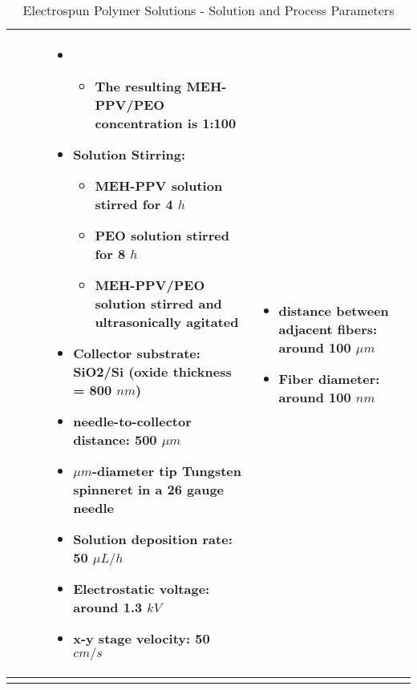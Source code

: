 \begin{landscape}
\begin{table}[th]
\caption{Electrospun Polymer Solutions - Solution and Process Parameters}
\begin{tabular}{
>{\raggedright\arraybackslash}p{0.130\textheight}
>{\raggedright\arraybackslash}p{0.130\textheight}
>{\raggedright\arraybackslash}p{0.090\textheight}
>{\raggedright\arraybackslash}p{0.310\textheight}
>{\raggedright\arraybackslash}p{0.180\textheight}
>{\raggedright\arraybackslash}p{0.060\textheight} } 
\hline
 &
 &
 &
\begin{itemize}[leftmargin=*]
\item[]
    \begin{itemize}[leftmargin=*]
    \item The resulting MEH-PPV/PEO concentration is 1:100
    \end{itemize}
\item Solution Stirring:
    \begin{itemize}[leftmargin=*]
    \item MEH-PPV solution stirred for 4 $h$
    \item PEO solution stirred for 8 $h$
    \item MEH-PPV/PEO solution stirred and ultrasonically agitated
    \end{itemize}
\item Collector substrate: SiO2/Si (oxide thickness = 800 $n m$)
\item needle-to-collector distance: 500 $\mu m$
\item $\mu m$-diameter tip Tungsten spinneret in a 26 gauge needle
\item Solution deposition rate: 50 $\mu L / h$
\item Electrostatic voltage: around 1.3 $k V$
\item x-y stage velocity: 50 $c m / s$
\end{itemize} &
\begin{itemize}
\item distance between adjacent fibers: around 100 $\mu m$
\item Fiber diameter: around 100 $n m$
\end{itemize} &
\cite{Camillo2013} \\ %
\hline
\label{tbl:FloresCompare}
\end{tabular}
\end{table}


\end{landscape}
